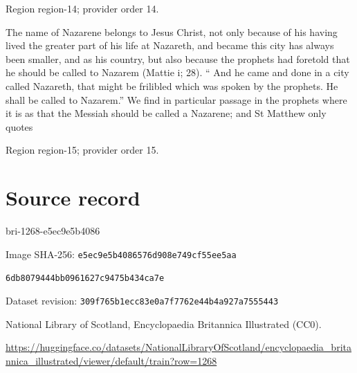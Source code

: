\documentclass[11pt]{article}
\begin{document}
{\scriptsize\color{gray} Region region-14; provider order 14.\par}
\medskip

The name of Nazarene belongs to Jesus Christ, not only because of his having lived the greater part of his life at Nazareth, and became this city has always been smaller, and as his country, but also because the prophets had foretold that he should be called to Nazarem (Mattie i; 28). “ And he came and done in a city called Nazareth, that might be frilibled which was spoken by the prophets. He shall be called to Nazarem.” We find in particular passage in the prophets where it is as that the Messiah should be called a Nazarene; and St Matthew only quotes
\par

{\scriptsize\color{gray} Region region-15; provider order 15.\par}
\medskip
\newpage\section*{Source record}
bri-1268-e5ec9e5b4086\par
Image SHA-256: \texttt{e5ec9e5b4086576d908e749cf55ee5aa}\par\texttt{6db8079444bb0961627c9475b434ca7e}\par
Dataset revision: \texttt{309f765b1ecc83e0a7f7}\texttt{762e44b4a927a7555443}\par
National Library of Scotland, Encyclopaedia Britannica Illustrated (CC0).\par
\url{https://huggingface.co/datasets/NationalLibraryOfScotland/encyclopaedia_britannica_illustrated/viewer/default/train?row=1268}
\end{document}
